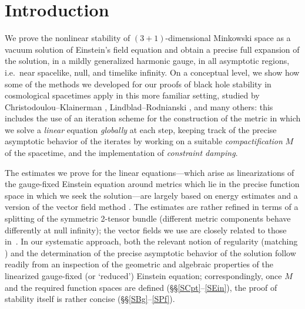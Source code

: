 \documentclass[reqno,11pt,letterpaper]{amsart}
\numberwithin{equation}{section}
\numberwithin{figure}{section}
\theoremstyle{definition}
\theoremstyle{remark}
\begin{document}
\section{Introduction}
\label{SI}

We prove the nonlinear stability of $(3+1)$-dimensional Minkowski space as a vacuum solution of Einstein's field equation and obtain a precise full expansion of the solution, in a mildly generalized harmonic gauge, in all asymptotic regions, i.e.\ near spacelike, null, and timelike infinity. On a conceptual level, we show how some of the methods we developed for our proofs of black hole stability in cosmological spacetimes \cite{HintzVasyKdSStability,HintzKNdSStability} apply in this more familiar setting, studied by Christodoulou--Klainerman \cite{ChristodoulouKlainermanStability}, Lindblad--Rodnianski \cite{LindbladRodnianskiGlobalExistence,LindbladRodnianskiGlobalStability}, and many others: this includes the use of an iteration scheme for the construction of the metric in which we solve a \emph{linear} equation \emph{globally} at each step, keeping track of the precise asymptotic behavior of the iterates by working on a suitable \emph{compactification} $M$ of the spacetime, and the implementation of \emph{constraint damping}.

The estimates we prove for the linear equations---which arise as linearizations of the gauge-fixed Einstein equation around metrics which lie in the precise function space in which we seek the solution---are largely based on energy estimates and a version of the vector field method \cite{KlainermanNullCondition}. The estimates are rather refined in terms of a splitting of the symmetric 2-tensor bundle (different metric components behave differently at null infinity); the vector fields we use are closely related to those in~\cite{KlainermanNullCondition,ChristodoulouKlainermanStability,LindbladRodnianskiGlobalExistence,LindbladRodnianskiGlobalStability}. In our systematic approach, both the relevant notion of regularity (matching \cite{LindbladAsymptotics}) and the determination of the precise asymptotic behavior of the solution follow readily from an inspection of the geometric and algebraic properties of the linearized gauge-fixed (or `reduced') Einstein equation; correspondingly, once $M$ and the required function spaces are defined (\S\S\ref{SCpt}--\ref{SEin}), the proof of stability itself is rather concise (\S\S\ref{SBg}--\ref{SPf}).
\end{document}
